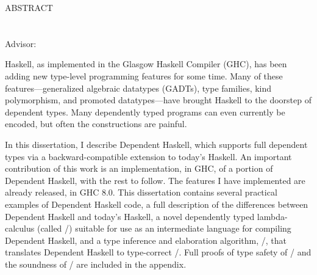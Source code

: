 \begin{doublespace}

\begin{centering}
{\Large ABSTRACT} \\
\Title \\
\Author \\
Advisor: \Advisor \\
\end{centering}

\vspace*{1in}

Haskell, as implemented in the Glasgow Haskell Compiler (GHC), has been adding
new type-level programming features for some time. Many of these features---gener\-al\-ized algebraic datatypes (GADTs), type families, kind
polymorphism, and promoted data\-types---have brought Haskell to the doorstep
of dependent types. Many dependently typed programs can even currently be
encoded, but often the constructions are painful.

In this dissertation, I describe Dependent Haskell, which supports full
dependent types via a backward-compatible extension to today's Haskell. An
important contribution of this work is an implementation, in GHC, of a
portion of Dependent
Haskell, with the rest to follow. The features I have implemented are already
released, in GHC 8.0.
This dissertation contains several practical examples of Dependent Haskell code,
a full description of the differences between
Dependent Haskell and today's Haskell, a novel dependently typed
lambda-calculus (called \pico/) suitable for use as an intermediate language
for compiling Dependent Haskell, and a type inference and elaboration
algorithm, \bake/, that translates Dependent Haskell to type-correct
\pico/. Full proofs of type safety of \pico/ and the soundness of \bake/ are
included in the appendix.

\end{doublespace}

